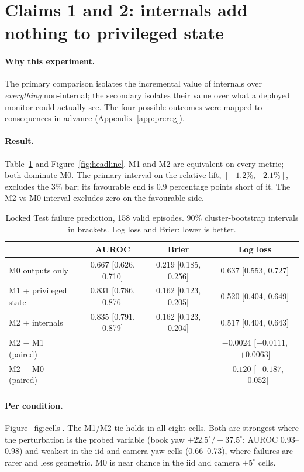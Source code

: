 \documentclass[11pt,a4paper]{article}
\newcommand{\Mz}{M0}\newcommand{\Mo}{M1}\newcommand{\Mt}{M2}
\begin{document}
\section{Claims 1 and 2: internals add nothing to privileged state}
\label{sec:claim1}
\paragraph{Why this experiment.} The primary comparison isolates the incremental value of internals over \emph{everything} non-internal; the secondary isolates their value over what a deployed monitor could actually see. The four possible outcomes were mapped to consequences in advance (Appendix~\ref{app:prereg}).

\paragraph{Result.} Table~\ref{tab:models} and Figure~\ref{fig:headline}. \Mo{} and \Mt{} are equivalent on every metric; both dominate \Mz{}. The primary interval on the relative lift, $[-1.2\%, +2.1\%]$, excludes the 3\% bar; its favourable end is 0.9 percentage points short of it. The \Mt{} vs \Mz{} interval excludes zero on the favourable side.

\begin{table}[htbp]
\centering\small
\caption{Locked Test failure prediction, 158 valid episodes. 90\% cluster-bootstrap intervals in brackets. Log loss and Brier: lower is better.}
\label{tab:models}
\begin{tabular}{lccc}
\toprule
& AUROC & Brier & Log loss \\
\midrule
\Mz{} outputs only & 0.667 [0.626, 0.710] & 0.219 [0.185, 0.256] & 0.637 [0.553, 0.727] \\
\Mo{} + privileged state & 0.831 [0.786, 0.876] & 0.162 [0.123, 0.205] & 0.520 [0.404, 0.649] \\
\Mt{} + internals & 0.835 [0.791, 0.879] & 0.162 [0.123, 0.204] & 0.517 [0.404, 0.643] \\
\midrule
\Mt{} $-$ \Mo{} (paired) & & & $-0.0024$ [$-0.0111$, $+0.0063$] \\
\Mt{} $-$ \Mz{} (paired) & & & $-0.120$ [$-0.187$, $-0.052$] \\
\bottomrule
\end{tabular}
\end{table}

\paragraph{Per condition.} Figure~\ref{fig:cells}. The \Mo{}/\Mt{} tie holds in all eight cells. Both are strongest where the perturbation is the probed variable (book yaw $+22.5^\circ/+37.5^\circ$: AUROC 0.93--0.98) and weakest in the iid and camera-yaw cells (0.66--0.73), where failures are rarer and less geometric. \Mz{} is near chance in the iid and camera $+5^\circ$ cells.
\end{document}
